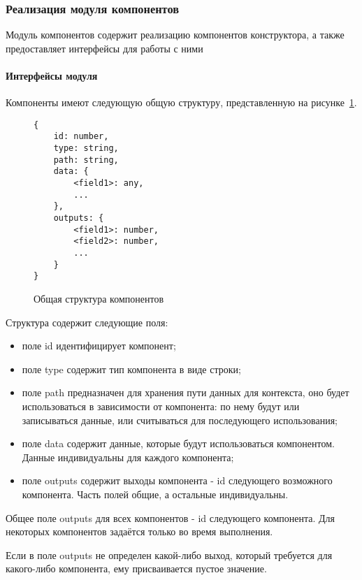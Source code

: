 
\subsubsection{Реализация модуля компонентов}


Модуль компонентов содержит реализацию компонентов конструктора, а также
предоставляет интерфейсы для работы с ними

\paragraph{Интерфейсы модуля}

Компоненты имеют следующую общую структуру, представленную на
рисунке~\ref{f:comp-struct}.


\begin{figure}[ht]
	\centering
	\vspace{\toppaddingoffigure}
	\begin{lstlisting}
{
    id: number,
    type: string,
    path: string,
    data: {
        <field1>: any,
        ...
    },
    outputs: {
        <field1>: number,
        <field2>: number,
        ...
    }
}

    \end{lstlisting}
	\caption{Общая структура компонентов}
	\label{f:comp-struct}
\end{figure}

Структура содержит следующие поля:
\begin{itemize}
	\item поле id идентифицирует компонент;
	\item поле type содержит тип компонента в виде строки;
	\item поле path предназначен для хранения пути данных для контекста,
	      оно будет использоваться в зависимости от компонента: по нему будут или
	      записываться данные, или считываться для последующего использования;
	\item поле data содержит данные, которые будут использоваться
	      компонентом. Данные индивидуальны для каждого компонента;
	\item поле outputs содержит выходы компонента - id следующего
	      возможного компонента. Часть полей общие, а остальные индивидуальны.

\end{itemize}
Общее поле outputs для всех компонентов - id следующего компонента.
Для некоторых компонентов задаётся только во время выполнения.

Если в поле outputs не определен какой-либо выход, который требуется
для какого-либо компонента, ему присваивается пустое значение.

